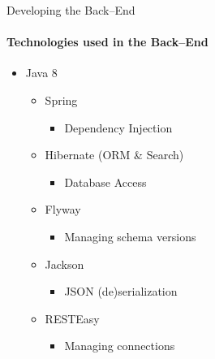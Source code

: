         \begin{frame}[t]{Developing the Back--End}\framesubtitle{Technologies used in the Back--End}
             \begin{itemize}
                 \item Java 8
                 \begin{itemize}
                    \item Spring
                    \begin{itemize}
                        \item Dependency Injection
                    \end{itemize}
                    \item Hibernate (ORM \& Search)
                    \begin{itemize}
                        \item Database Access
                    \end{itemize}
                    \item Flyway
                    \begin{itemize}
                        \item Managing schema versions
                    \end{itemize}
                    \item Jackson
                    \begin{itemize}
                        \item JSON (de)serialization 
                    \end{itemize}
                    \item RESTEasy
                    \begin{itemize}
                        \item Managing connections
                    \end{itemize}
                 \end{itemize}
             \end{itemize}
        \end{frame}

